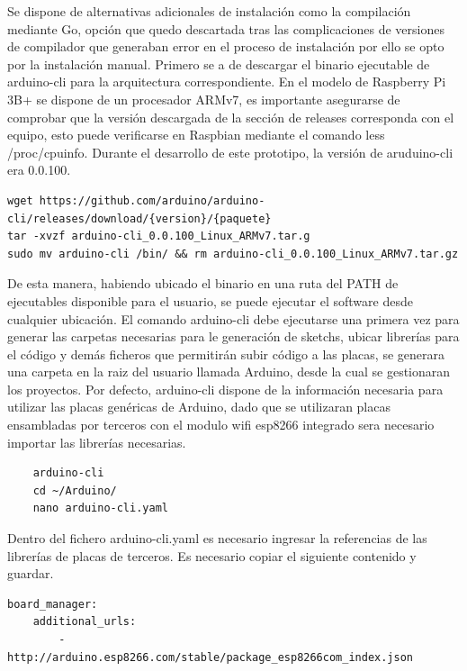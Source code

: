 \vspace{0.5cm}

Se dispone de alternativas adicionales de instalación como la compilación mediante Go, opción que quedo descartada tras las complicaciones de versiones de compilador que generaban error en el proceso de instalación por ello se opto por la instalación manual. Primero se a de descargar el binario ejecutable de arduino-cli para la arquitectura correspondiente. En el modelo de Raspberry Pi 3B+ se dispone de un procesador ARMv7, es importante asegurarse de comprobar que la versión descargada de la sección de releases corresponda con el equipo, esto puede verificarse en Raspbian mediante el comando less /proc/cpuinfo. Durante el desarrollo de este prototipo, la versión de aruduino-cli era 0.0.100. 

\begin{verbatim}
wget https://github.com/arduino/arduino-cli/releases/download/{version}/{paquete}
tar -xvzf arduino-cli_0.0.100_Linux_ARMv7.tar.g
sudo mv arduino-cli /bin/ && rm arduino-cli_0.0.100_Linux_ARMv7.tar.gz
\end{verbatim}

De esta manera, habiendo ubicado el binario en una ruta del PATH de ejecutables disponible para el usuario, se puede ejecutar el software desde cualquier ubicación.
El comando arduino-cli debe ejecutarse una primera vez para generar las carpetas necesarias para le generación de sketchs, ubicar librerías para el código y demás ficheros que permitirán subir código a las placas, se generara una carpeta en la raiz del usuario llamada Arduino, desde la cual se gestionaran los proyectos. Por defecto, arduino-cli dispone de la información necesaria para utilizar las placas genéricas de Arduino, dado que se utilizaran placas ensambladas por terceros con el modulo \gls{wifi} esp8266 integrado sera necesario importar las librerías necesarias.

\begin{verbatim}
    arduino-cli
    cd ~/Arduino/
    nano arduino-cli.yaml
\end{verbatim}

Dentro del fichero arduino-cli.yaml es necesario ingresar la referencias de las librerías de placas de terceros. Es necesario copiar el siguiente contenido y guardar.
    
\begin{verbatim}
board_manager:
    additional_urls:
        - http://arduino.esp8266.com/stable/package_esp8266com_index.json
\end{verbatim}
    
